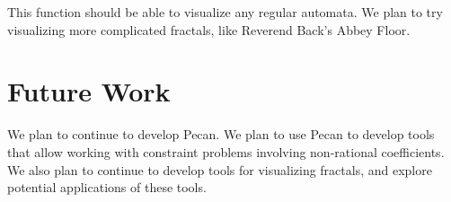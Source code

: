 \documentclass[10pt,usenames,dvipsnames]{article}
\begin{document}
This function should be able to visualize any regular automata. 
We plan to try visualizing more complicated fractals, like Reverend Back's Abbey Floor.

\section{Future Work}

We plan to continue to develop Pecan.
We plan to use Pecan to develop tools that allow working with constraint problems involving non-rational coefficients.
We also plan to continue to develop tools for visualizing fractals, and explore potential applications of these tools.

\printbibliography
\end{document}
